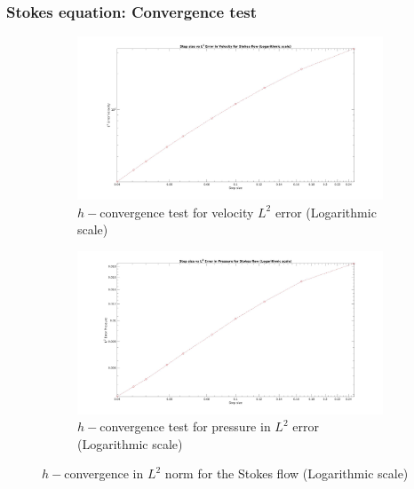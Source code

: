 \documentclass{beamer}
\begin{document}

\begin{frame}
\frametitle{Stokes equation: Convergence test}
\begin{figure}
\begin{subfigure}{0.4\textwidth}	
  \includegraphics[width=\linewidth]{l2_velocity_log_stokes.jpg}
  \caption{$h-$convergence test for velocity $L^2$ error (Logarithmic scale)}
  \label{fig:vel_stoke_conv_log}
\end{subfigure}
\begin{subfigure}{0.4\textwidth}	
  \includegraphics[width=\linewidth]{l2_pressure_log_stokes.jpg}
  \caption{$h-$convergence test for pressure in $L^2$ error (Logarithmic scale)}
  \label{fig:pre_stoke_conv_log}
\end{subfigure}
\caption{$h-$convergence in $L^2$ norm for the Stokes flow (Logarithmic scale)}
\label{fig:l2_stokes}
\end{figure}
\end{frame}
\end{document}
